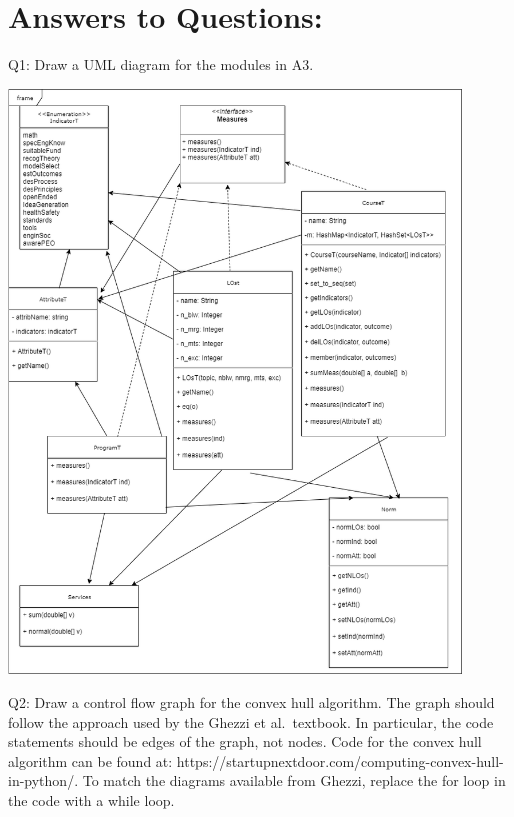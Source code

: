 \documentclass[12pt]{article}
\begin{document}
\section*{Answers to Questions:}

Q1: Draw a UML diagram for the modules in A3.\\

\begin{center}
\includegraphics[width=0.9\textwidth]{UML.png}
\end{center}

\medskip
\medskip



\noindent Q2: Draw a control flow graph for the convex hull algorithm.  The graph should
  follow the approach used by the Ghezzi et al.\ textbook.  In particular, the
  code statements should be edges of the graph, not nodes.  Code for the convex
  hull algorithm can be found at:
   https://startupnextdoor.com/computing-convex-hull-in-python/. To match the
  diagrams available from Ghezzi, replace the for loop in the code with a while
  loop.
\end{document}
